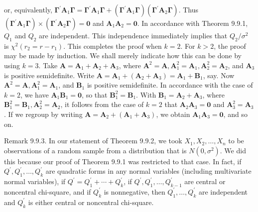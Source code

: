 or, equivalently, $\boldsymbol{\Gamma}^{\prime} \boldsymbol{A}_{1} \boldsymbol{\Gamma}=\boldsymbol{\Gamma}^{\prime} \boldsymbol{A}_{1} \boldsymbol{\Gamma}+\left(\boldsymbol{\Gamma}^{\prime} \boldsymbol{A}_{1} \boldsymbol{\Gamma}\right)\left(\boldsymbol{\Gamma}^{\prime} \boldsymbol{A}_{2} \boldsymbol{\Gamma}\right)$. Thus $\left(\boldsymbol{\Gamma}^{\prime} \boldsymbol{A}_{1} \boldsymbol{\Gamma}\right) \times\left(\boldsymbol{\Gamma}^{\prime} \boldsymbol{A}_{2} \boldsymbol{\Gamma}\right)=\mathbf{0}$ and $\boldsymbol{A}_{1} \boldsymbol{A}_{2}=\mathbf{0}$. In accordance with Theorem 9.9.1, $Q_{1}$ and $Q_{2}$ are independent. This independence immediately implies that $Q_{2} / \sigma^{2}$ is $\chi^{2}\left(r_{2}=r-r_{1}\right)$. This completes the proof when $k=2$. For $k>2$, the proof may be made by induction. We shall merely indicate how this can be done by using $k=3$. Take $\boldsymbol{A}=\boldsymbol{A}_{1}+\boldsymbol{A}_{2}+\boldsymbol{A}_{3}$, where $\boldsymbol{A}^{2}=\boldsymbol{A}, \boldsymbol{A}_{1}^{2}=\boldsymbol{A}_{1}, \boldsymbol{A}_{2}^{2}=\boldsymbol{A}_{2}$, and $\boldsymbol{A}_{3}$ is positive semidefinite. Write $\boldsymbol{A}=\boldsymbol{A}_{1}+\left(\boldsymbol{A}_{2}+\boldsymbol{A}_{3}\right)=\boldsymbol{A}_{1}+\boldsymbol{B}_{1}$, say. Now $\boldsymbol{A}^{2}=\boldsymbol{A}, \boldsymbol{A}_{1}^{2}=\boldsymbol{A}_{1}$, and $\boldsymbol{B}_{1}$ is positive semidefinite. In accordance with the case of $k=2$, we have $\boldsymbol{A}_{1} \boldsymbol{B}_{1}=\mathbf{0}$, so that $\boldsymbol{B}_{1}^{2}=\boldsymbol{B}_{1}$. With $\boldsymbol{B}_{1}=\boldsymbol{A}_{2}+\boldsymbol{A}_{3}$, where $\boldsymbol{B}_{1}^{2}=\boldsymbol{B}_{1}, \boldsymbol{A}_{2}^{2}=\boldsymbol{A}_{2}$, it follows from the case of $k=2$ that $\boldsymbol{A}_{2} \boldsymbol{A}_{3}=\mathbf{0}$ and $\boldsymbol{A}_{3}^{2}=\boldsymbol{A}_{3}$. If we regroup by writing $\boldsymbol{A}=\boldsymbol{A}_{2}+\left(\boldsymbol{A}_{1}+\boldsymbol{A}_{3}\right)$, we obtain $\boldsymbol{A}_{1} \boldsymbol{A}_{3}=\mathbf{0}$, and so on.

Remark 9.9.3. In our statement of Theorem 9.9.2, we took $X_{1}, X_{2}, \ldots, X_{n}$ to be observations of a random sample from a distribution that is $N\left(0, \sigma^{2}\right)$. We did this because our proof of Theorem 9.9.1 was restricted to that case. In fact, if $Q^{\prime}, Q_{1}^{\prime}, \ldots, Q_{k}^{\prime}$ are quadratic forms in any normal variables (including multivariate normal variables), if $Q^{\prime}=Q_{1}^{\prime}+\cdots+Q_{k}^{\prime}$, if $Q^{\prime}, Q_{1}^{\prime}, \ldots, Q_{k-1}^{\prime}$ are central or noncentral chi-square, and if $Q_{k}^{\prime}$ is nonnegative, then $Q_{1}^{\prime}, \ldots, Q_{k}^{\prime}$ are independent and $Q_{k}^{\prime}$ is either central or noncentral chi-square.

